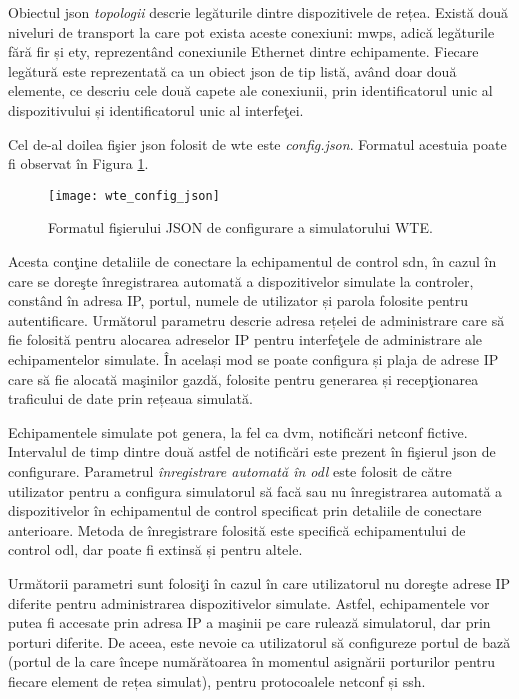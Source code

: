 Obiectul \gls{json} \textit{topologii} descrie legăturile dintre dispozitivele de rețea. Există două niveluri de transport la care pot exista aceste conexiuni: \gls{mwps}, adică legăturile fără fir și \gls{ety}, reprezentând conexiunile Ethernet dintre echipamente. Fiecare legătură este reprezentată ca un obiect \gls{json} de tip listă, având doar două elemente, ce descriu cele două capete ale conexiunii, prin identificatorul unic al dispozitivului și identificatorul unic al interfeţei.

Cel de-al doilea fişier \gls{json} folosit de \gls{wte} este \textit{config.json}. Formatul acestuia poate fi observat în Figura \ref{fig:wte_config_json}.

\begin{figure}[h]
	\centering
	\texttt{[image: wte\_config\_json]}
	\caption{Formatul fişierului JSON de configurare a simulatorului WTE.}
	\label{fig:wte_config_json}
\end{figure}

Acesta conţine detaliile de conectare la echipamentul de control \gls{sdn}, în cazul în care se doreşte înregistrarea automată a dispozitivelor simulate la controler, constând în adresa IP, portul, numele de utilizator și parola folosite pentru autentificare. Următorul parametru descrie adresa rețelei de administrare care să fie folosită pentru alocarea adreselor IP pentru interfeţele de administrare ale echipamentelor simulate. În același mod se poate configura și plaja de adrese IP care să fie alocată maşinilor gazdă, folosite pentru generarea și recepţionarea traficului de date prin rețeaua simulată. 

Echipamentele simulate pot genera, la fel ca \gls{dvm}, notificări \gls{netconf} fictive. Intervalul de timp dintre două astfel de notificări este prezent în fişierul \gls{json} de configurare. Parametrul \textit{înregistrare automată în \gls{odl}} este folosit de către utilizator pentru a configura simulatorul să facă sau nu înregistrarea automată a dispozitivelor în echipamentul de control specificat prin detaliile de conectare anterioare. Metoda de înregistrare folosită este specifică echipamentului de control \gls{odl}, dar poate fi extinsă și pentru altele.

Următorii parametri sunt folosiţi în cazul în care utilizatorul nu doreşte adrese IP diferite pentru administrarea dispozitivelor simulate. Astfel, echipamentele vor putea fi accesate prin adresa IP a maşinii pe care rulează simulatorul, dar prin porturi diferite. De aceea, este nevoie ca utilizatorul să configureze portul de bază (portul de la care începe numărătoarea în momentul asignării porturilor pentru fiecare element de rețea simulat), pentru protocoalele \gls{netconf} și \gls{ssh}.

